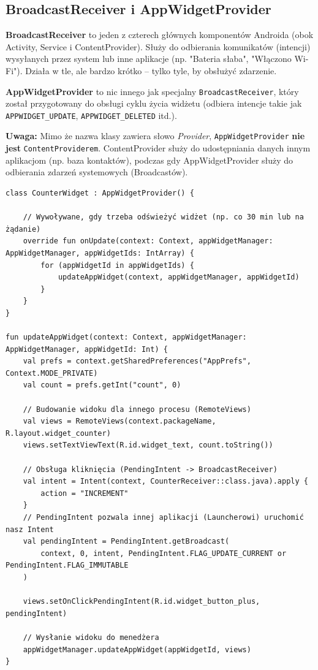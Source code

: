 \subsection{BroadcastReceiver i AppWidgetProvider}

\textbf{BroadcastReceiver} to jeden z czterech głównych komponentów Androida (obok Activity, Service i ContentProvider). Służy do odbierania komunikatów (intencji) wysyłanych przez system lub inne aplikacje (np. "Bateria słaba", "Włączono Wi-Fi"). Działa w tle, ale bardzo krótko – tylko tyle, by obsłużyć zdarzenie.

\textbf{AppWidgetProvider} to nic innego jak specjalny \texttt{BroadcastReceiver}, który został przygotowany do obsługi cyklu życia widżetu (odbiera intencje takie jak \texttt{APPWIDGET\_UPDATE}, \texttt{APPWIDGET\_DELETED} itd.).


\textbf{Uwaga:} Mimo że nazwa klasy zawiera słowo \textit{Provider}, \texttt{AppWidgetProvider} \textbf{nie jest} \texttt{ContentProviderem}. ContentProvider służy do udostępniania danych innym aplikacjom (np. baza kontaktów), podczas gdy AppWidgetProvider służy do odbierania zdarzeń systemowych (Broadcastów).

\begin{verbatim}
class CounterWidget : AppWidgetProvider() {

    // Wywoływane, gdy trzeba odświeżyć widżet (np. co 30 min lub na żądanie)
    override fun onUpdate(context: Context, appWidgetManager: AppWidgetManager, appWidgetIds: IntArray) {
        for (appWidgetId in appWidgetIds) {
            updateAppWidget(context, appWidgetManager, appWidgetId)
        }
    }
}

fun updateAppWidget(context: Context, appWidgetManager: AppWidgetManager, appWidgetId: Int) {
    val prefs = context.getSharedPreferences("AppPrefs", Context.MODE_PRIVATE)
    val count = prefs.getInt("count", 0)

    // Budowanie widoku dla innego procesu (RemoteViews)
    val views = RemoteViews(context.packageName, R.layout.widget_counter)
    views.setTextViewText(R.id.widget_text, count.toString())

    // Obsługa kliknięcia (PendingIntent -> BroadcastReceiver)
    val intent = Intent(context, CounterReceiver::class.java).apply {
        action = "INCREMENT"
    }
    // PendingIntent pozwala innej aplikacji (Launcherowi) uruchomić nasz Intent
    val pendingIntent = PendingIntent.getBroadcast(
        context, 0, intent, PendingIntent.FLAG_UPDATE_CURRENT or PendingIntent.FLAG_IMMUTABLE
    )
    
    views.setOnClickPendingIntent(R.id.widget_button_plus, pendingIntent)

    // Wysłanie widoku do menedżera
    appWidgetManager.updateAppWidget(appWidgetId, views)
}
\end{verbatim}

